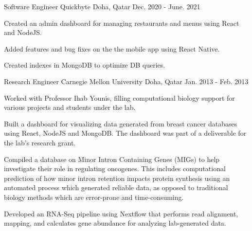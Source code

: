 \begin{cventries}
  \cventry
    {Software Engineer} %
    {Quickbyte} %
    {Doha, Qatar} %
    {Dec. 2020 - June. 2021} %
    {
      \begin{cvitems} %
        \item {Created an admin dashboard for managing restaurants and menus using React and NodeJS.}
        \item {Added features and bug fixes on the the mobile app using React Native.}
        \item {Created indexes in MongoDB to optimize DB queries.}
      \end{cvitems}
    }

  \cventry
    {Research Engineer} %
    {Carnegie Mellon University} %
    {Doha, Qatar} %
    {Jan. 2013 - Feb. 2013} %
    {
      \begin{cvitems} %
        \item {Worked with Professor Ihab Younis, filling computational biology support for various projects and students under the lab.}
        \item {Built a dashboard for visualizing data generated from breast cancer databases using React, NodeJS and MongoDB. The
        dashboard was part of a deliverable for the lab’s research grant.}
        \item {Compiled a database on Minor Intron Containing Genes (MIGs) to help investigate their role in regulating oncogenes. This
        includes computational prediction of how minor intron retention impacts protein synthesis using an automated process
        which generated reliable data, as opposed to traditional biology methods which are error-prone and time-consuming.}
        \item {Developed an RNA-Seq pipeline using Nextflow that performs read alignment, mapping, and calculates gene abundance for
        analyzing lab-generated data.}
      \end{cvitems}
    }

\end{cventries}
